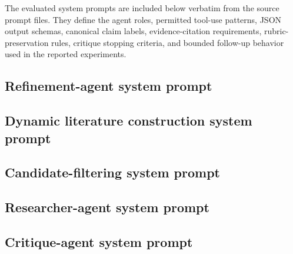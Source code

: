 \documentclass[10pt]{article}
\begin{document}
The evaluated system prompts are included below verbatim from the source
prompt files. They define the agent roles, permitted tool-use patterns,
JSON output schemas, canonical claim labels, evidence-citation requirements,
rubric-preservation rules, critique stopping criteria, and bounded follow-up
behavior used in the reported experiments.

\subsection*{Refinement-agent system prompt}

\subsection*{Dynamic literature construction system prompt}

\subsection*{Candidate-filtering system prompt}

\subsection*{Researcher-agent system prompt}

\subsection*{Critique-agent system prompt}
\end{document}
